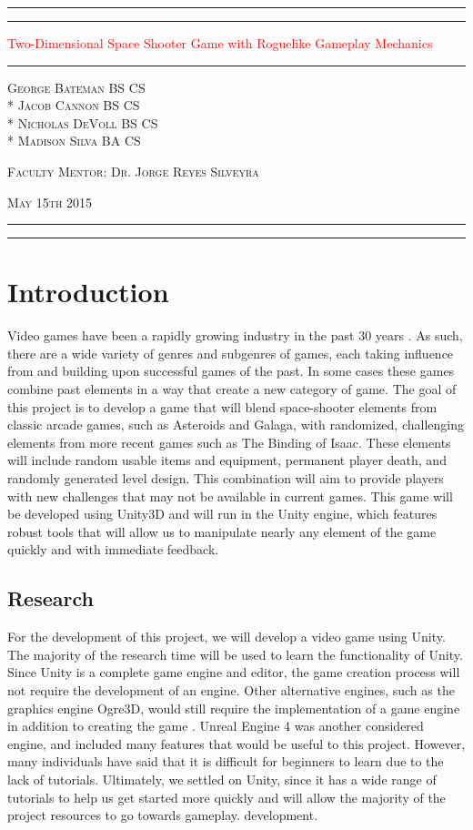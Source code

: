 \documentclass[12pt]{article}       %
\def\hs{\hspace{15pt}}
\newcommand*{\titleAT}{\begingroup %
\newlength{\drop} %
\drop=0.1\textheight %

\rule{\textwidth}{1pt}\par %
\vspace{2pt}\vspace{-\baselineskip} %
\rule{\textwidth}{0.4pt}\par %

\vspace{\drop} %
\centering %
\textcolor{Red}{ %
{\Huge Two-Dimensional Space Shooter Game with Roguelike Gameplay Mechanics}\\[0.5\baselineskip] %
{\Huge }} %

\vspace{0.25\drop} %
\rule{0.3\textwidth}{0.4pt}\par %
\vspace{\drop} %

{\Large \textsc{George Bateman BS CS \\* Jacob Cannon BS CS \\* Nicholas DeVoll BS CS \\* \vspace{3pt} Madison Silva BA CS}}\par %

\vfill %

{\large \textsc{Faculty Mentor: Dr. Jorge Reyes Silveyra}}\par 

{\large \textsc{May 15th 2015}}\par

\vspace*{\drop} %

\rule{\textwidth}{0.4pt}\par %
\vspace{2pt}\vspace{-\baselineskip} %
\rule{\textwidth}{1pt}\par %

\endgroup}
\begin{document}
\begin{titlepage}
\thispagestyle{empty}
\titleAT
\end{titlepage}

\newpage
\begin{titlepage}
\thispagestyle{empty}
\tableofcontents
\end{titlepage}

\begin{titlepage}
\thispagestyle{empty}
\listoffigures
\end{titlepage}


\newpage

\section{Introduction} %
\label{sec:intro}

\hs Video games have been a rapidly growing industry in the past 30 years \cite{History}. As such, there are a wide variety of genres and subgenres of games, each taking influence from and building upon successful games of the past. In some cases these games combine past elements in a way that create a new category of game. The goal of this project is to develop a game that will blend space-shooter elements from classic arcade games, such as Asteroids and Galaga, with randomized, challenging elements from more recent games such as The Binding of Isaac. These elements will include random usable items and equipment, permanent player death, and randomly generated level design. This combination will aim to provide players with new challenges that may not be available in current games. This game will be developed using Unity3D and will run in the Unity engine, which features robust tools that will allow us to manipulate nearly any element of the game quickly and with immediate feedback.

\subsection{Research}
	For the development of this project, we will develop a video game using Unity. The majority of the research time will be used to learn the functionality of Unity. Since Unity is a complete game engine and editor, the game creation process will not require the development of an engine. Other alternative engines, such as the graphics engine Ogre3D, would still require the implementation of a game engine in addition to creating the game \cite{Ogre}. Unreal Engine 4 was another considered engine, and included many features that would be useful to this project. However, many individuals have said that it is difficult for beginners to learn due to the lack of tutorials. Ultimately, we settled on Unity, since it has a wide range of tutorials to help us get started more quickly and will allow the majority of the project resources to go towards gameplay. development.
\end{document}
